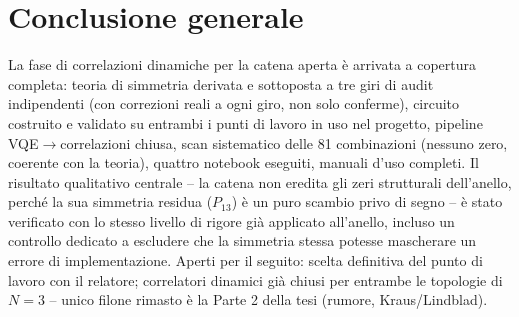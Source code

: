 \documentclass[11pt,a4paper]{article}
\begin{document}
\section*{Conclusione generale}

La fase di correlazioni dinamiche per la catena aperta è arrivata a copertura completa: teoria di
simmetria derivata e sottoposta a tre giri di audit indipendenti (con correzioni reali a ogni
giro, non solo conferme), circuito costruito e validato su entrambi i punti di lavoro in uso nel
progetto, pipeline VQE$\to$correlazioni chiusa, scan sistematico delle 81 combinazioni (nessuno
zero, coerente con la teoria), quattro notebook eseguiti, manuali d'uso completi. Il risultato
qualitativo centrale -- la catena non eredita gli zeri strutturali dell'anello, perché la sua
simmetria residua ($P_{13}$) è un puro scambio privo di segno -- è stato verificato con lo stesso
livello di rigore già applicato all'anello, incluso un controllo dedicato a escludere che la
simmetria stessa potesse mascherare un errore di implementazione. Aperti per il seguito: scelta
definitiva del punto di lavoro con il relatore; correlatori dinamici già chiusi per entrambe le
topologie di $N=3$ -- unico filone rimasto è la Parte 2 della tesi (rumore, Kraus/Lindblad).
\end{document}

